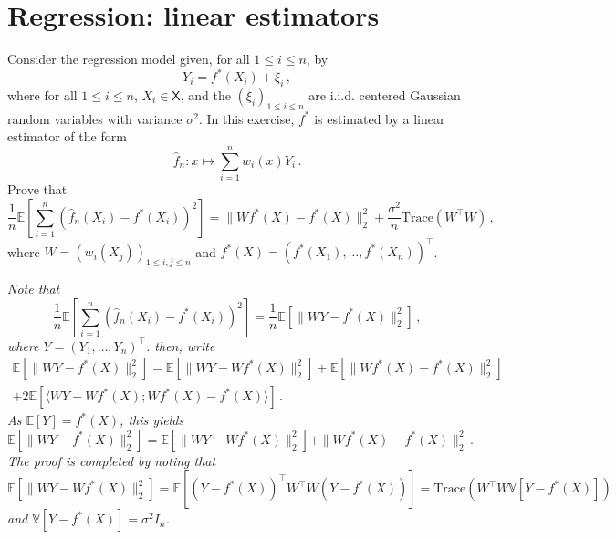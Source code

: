 \documentclass[a4paper,10pt,fleqn]{article}
\newcommand{\eqsp}{\,}
\newcommand{\xset}{\ensuremath{\mathsf{X}}}
\newcommand{\1}{\ensuremath{\mathbbm{1}}}
\newcommand{\bE}{\mathbb{E}}
\begin{document}
\section*{Regression: linear estimators}
Consider the regression model given, for all $1\leqslant i\leqslant n$, by
$$
Y_{i}=f^*(X_{i})+\xi_{i}\eqsp,
$$
where for all $1\leqslant i\leqslant n$, $X_i\in\xset$, and the $(\xi_{i})_{1\leqslant i \leqslant n}$ are i.i.d. centered Gaussian random variables with variance $\sigma^2$. In this exercise, $f^*$ is estimated by a linear estimator of the form
$$
\widehat f_n: x \mapsto \sum_{i = 1}^n w_i(x)Y_i\eqsp.
$$
Prove that
$$
\frac{1}{n}\bE\left[\sum_{i=1}^n(\widehat f_n(X_i) - f^*(X_i))^2\right] = \|Wf^*(X) - f^*(X)\|_2^2 + \frac{\sigma^2}{n}\mathrm{Trace}(W^\top W)\eqsp, 
$$
where $W = (w_i(X_j))_{1\leqslant i,j \leqslant n}$ and $f^*(X) = (f^*(X_1),\ldots,f^*(X_n))^\top$.

\vspace{.2cm}

{\em
Note that
$$
\frac{1}{n}\bE\left[\sum_{i=1}^n(\widehat f_n(X_i) - f^*(X_i))^2\right] = \frac{1}{n}\bE\left[\|WY - f^*(X)\|_2^2\right]\eqsp,
$$
where $Y = (Y_1,\ldots,Y_n)^\top$. then, write
\begin{multline*}
\bE\left[\|WY - f^*(X)\|_2^2\right] = \bE\left[\|WY - Wf^*(X)\|_2^2\right] + \bE\left[\|Wf^*(X) - f^*(X)\|_2^2\right]\\ + 2\bE\left[\langle WY - Wf^*(X); Wf^*(X) - f^*(X)\rangle\right]\eqsp.
\end{multline*}
As $\bE[Y] = f^*(X)$, this yields
$$
\bE\left[\|WY - f^*(X)\|_2^2\right] = \bE\left[\|WY - Wf^*(X)\|_2^2\right] + \|Wf^*(X) - f^*(X)\|_2^2\eqsp.
$$
The proof is completed by noting that
$$
 \bE\left[\|WY - Wf^*(X)\|_2^2\right] =  \bE\left[(Y - f^*(X))^\top W^\top W(Y - f^*(X))\right] = \mathrm{Trace}\left(  W^\top W \mathbb{V}[Y - f^*(X)]\right)
$$
and $\mathbb{V}[Y - f^*(X)] = \sigma^2 I_n$.
}
\end{document}
